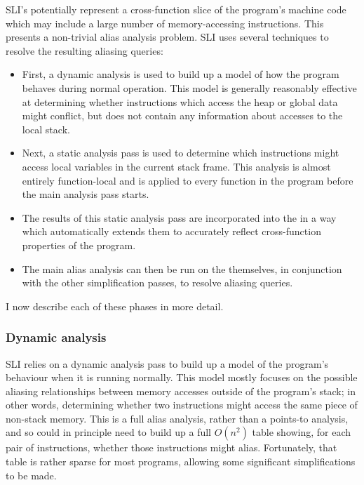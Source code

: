 
SLI's {\StateMachines} potentially represent a cross-function slice of
the program's machine code which may include a large number of
memory-accessing instructions.  This presents a non-trivial alias
analysis problem.  SLI uses several techniques to resolve the
resulting aliasing queries:

\begin{itemize}
\item
  First, a dynamic analysis is used to build up a model of how the
  program behaves during normal operation.  This model is generally
  reasonably effective at determining whether instructions which
  access the heap or global data might conflict, but does not contain
  any information about accesses to the local stack.
\item
  Next, a static analysis pass is used to determine which instructions
  might access local variables in the current stack frame.  This
  analysis is almost entirely function-local and is applied to every
  function in the program before the main analysis pass
  starts.
\item
  The results of this static analysis pass are incorporated into the
  {\StateMachines} in a way which automatically extends them to
  accurately reflect cross-function properties of the program.
\item
  The main alias analysis can then be run on the {\StateMachines}
  themselves, in conjunction with the other {\StateMachine}
  simplification passes, to resolve aliasing queries.
\end{itemize}

I now describe each of these phases in more detail.

\subsubsection{Dynamic analysis}

SLI relies on a dynamic analysis pass to build up a model of the
program's behaviour when it is running normally.  This model mostly
focuses on the possible aliasing relationships between memory accesses
outside of the program's stack; in other words, determining whether
two instructions might access the same piece of non-stack memory.
This is a full alias analysis, rather than a points-to analysis, and
so could in principle need to build up a full $O(n^2)$ table showing,
for each pair of instructions, whether those instructions might alias.
Fortunately, that table is rather sparse for most programs, allowing
some significant simplifications to be made.

